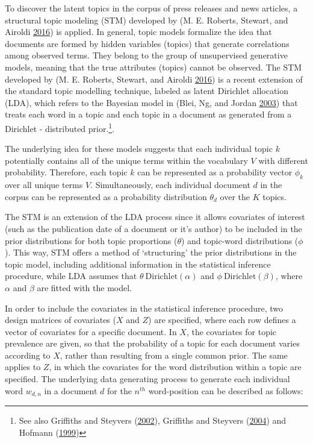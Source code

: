 \documentclass[
]{article}
\begin{document}
To discover the latent topics in the corpus of press releases and news
articles, a structural topic modeling (STM) developed by (M. E. Roberts,
Stewart, and Airoldi \protect\hyperlink{ref-roberts_model_2016}{2016})
is applied. In general, topic models formalize the idea that documents
are formed by hidden variables (topics) that generate correlations among
observed terms. They belong to the group of unsupervised generative
models, meaning that the true attributes (topics) cannot be observed.
The STM developed by (M. E. Roberts, Stewart, and Airoldi
\protect\hyperlink{ref-roberts_model_2016}{2016}) is a recent extension
of the standard topic modelling technique, labeled as latent Dirichlet
allocation (LDA), which refers to the Bayesian model in (Blei, Ng, and
Jordan \protect\hyperlink{ref-blei_latent_2003}{2003}) that treats each
word in a topic and each topic in a document as generated from a
Dirichlet - distributed prior.\footnote{See also Griffiths and Steyvers
  (\protect\hyperlink{ref-griffiths_probabilistic_2002}{2002}),
  Griffiths and Steyvers
  (\protect\hyperlink{ref-griffiths_finding_2004}{2004}) and Hofmann
  (\protect\hyperlink{ref-hofmann_probabilistic_1999}{1999})}.

The underlying idea for these models suggests that each individual topic
\(k\) potentially contains all of the unique terms within the vocabulary
\(V\) with different probability. Therefore, each topic \(k\) can be
represented as a probability vector \(\phi_k\) over all unique terms
\(V\). Simultaneously, each individual document \(d\) in the corpus can
be represented as a probability distribution \(\theta_d\) over the \(K\)
topics.

The STM is an extension of the LDA process since it allows covariates of
interest (such as the publication date of a document or it's author) to
be included in the prior distributions for both topic proportions
(\(\theta\)) and topic-word distributions (\(\phi\)). This way, STM
offers a method of `structuring' the prior distributions in the topic
model, including additional information in the statistical inference
procedure, while LDA assumes that \(\theta ~ \text{Dirichlet}(\alpha)\)
and \(\phi ~ \text{Dirichlet}(\beta)\), where \(\alpha\) and \(\beta\)
are fitted with the model.

In order to include the covariates in the statistical inference
procedure, two design matrices of covariates (\(X\) and \(Z\)) are
specified, where each row defines a vector of covariates for a specific
document. In \(X\), the covariates for topic prevalence are given, so
that the probability of a topic for each document varies according to
\(X\), rather than resulting from a single common prior. The same
applies to \(Z\), in which the covariates for the word distribution
within a topic are specified. The underlying data generating process to
generate each individual word \(w_{d,n}\) in a document \(d\) for the
\(n^{th}\) word-position can be described as follows:
\end{document}
